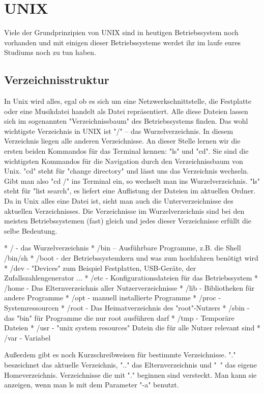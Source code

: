 \section {UNIX}

Viele der Grundprinzipien von UNIX sind in heutigen Betriebssystem noch vorhanden und mit einigen dieser Betriebssysteme werdet ihr im laufe eures Studiums noch zu tun haben.

\subsection {Verzeichnisstruktur}
In Unix wird alles, egal ob es sich um eine Netzwerkschnittstelle, die Festplatte oder eine Musikdatei handelt als Datei repräsentiert. Alle diese Dateien lassen sich im sogenannten "Verzeichnissbaum" des Betriebssystems finden. Das wohl wichtigste Verzeichnis in UNIX ist "/" – das Wurzelverzeichnis. In diesem Verzeichnis liegen alle anderen Verzeichnisse.
An dieser Stelle lernen wir die ersten beiden Kommandos für das Terminal kennen: "ls" und "cd". Sie sind die wichtigsten Kommandos für die Navigation durch den Verzeichnissbaum von Unix. "cd" steht für "change directory" und lässt uns das Verzeichnis wechseln. Gibt man also "cd /" ins Terminal ein, so wechselt man ins Wurzelverzeichnis. "ls" steht für "list search", es liefert eine Auflistung der Dateien im aktuellen Ordner.
Da in Unix alles eine Datei ist, sieht man auch die Unterverzeichnisse des aktuellen Verzeichnisses.
Die Verzeichnisse im Wurzelverzeichnis sind bei den meisten Betriebssystemen (fast) gleich und jedes dieser Verzeichnisse erfüllt die selbe Bedeutung.

* / - das Wurzelverzeichnis
* /bin – Ausführbare Programme, z.B. die Shell /bin/sh 
* /boot - der Betriebssystemkern und was zum hochfahren benötigt wird
* /dev - "Devices" zum Beispiel Festplatten, USB-Geräte, der Zufallszahlengenerator ...
* /etc - Konfigurationsdateien für das Betriebssystem 
* /home - Das Elternverzeichnis aller Nutzerverzeichnisse
* /lib - Bibliotheken für andere Programme
* /opt - manuell installierte Programme
* /proc - Systemressourcen
* /root - Das Heimatverzeichnis des "root"-Nutzers
* /sbin - das "bin" für Programme die nur root ausführen darf
* /tmp - Temporäre Dateien
* /usr - "unix system resources" Datein die für alle Nutzer relevant sind
* /var - Variabel

Außerdem gibt es noch Kurzschreibweisen für bestimmte Verzeichnisse. "." beszeichnet das aktuelle Verzeichnis, ".." das Elternverzeichnis und "~" das eigene Homeverzeichnis.
Verzeichnisse die mit "." beginnen sind versteckt. Man kann sie anzeigen, wenn man ls mit dem Parameter "-a" benutzt.

